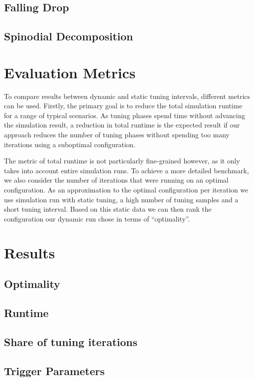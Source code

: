 \subsection{Falling Drop}
\label{subsec:fd}
\subsection{Spinodial Decomposition}
\label{subsec:sd}

\section{Evaluation Metrics}
To compare results between dynamic and static tuning intervals, different metrics can be used. 
Firstly, the primary goal is to reduce the total simulation runtime for a range of typical scenarios. As tuning phases spend time without advancing the simulation result, a reduction in total runtime is the expected result if our approach reduces the number of tuning phases without spending too many iterations using a suboptimal configuration.

The metric of total runtime is not particularly fine-grained however, as it only takes into account entire simulation runs. To achieve a more detailed benchmark, we also consider the number of iterations that were running on an optimal configuration. As an approximation to the optimal configuration per iteration we use simulation run with static tuning, a high number of tuning samples and a short tuning interval. Based on this static data we can then rank the configuration our dynamic run chose in terms of \enquote{optimality}.



\section{Results}
\subsection{Optimality}
\subsection{Runtime}
\subsection{Share of tuning iterations}
\subsection{Trigger Parameters}

